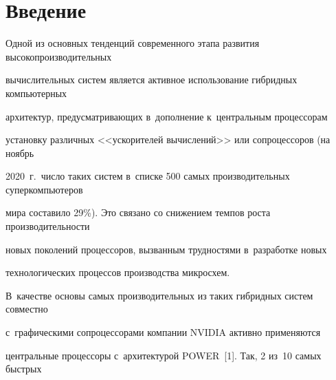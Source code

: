 














 \thispagestyle{headings}


 


 \vspace*{-20pt}





\section{Введение}





Одной из основных тенденций современного этапа развития высокопроизводительных 


вычислительных систем является активное использование гибридных компьютерных 


архитектур, предусматривающих в~дополнение к~центральным процессорам 


установку различных <<ускорителей вычислений>> или сопроцессоров (на ноябрь 


2020~г.\ число таких систем в~списке 500 самых производительных суперкомпьютеров 


мира составило 29\%). Это связано со снижением темпов рос\-та производительности 


новых поколений процессоров, вызванным трудностями в~разработке новых 


технологических процессов производства микросхем.





В~качестве основы самых производительных из таких гибридных систем совместно 


с~графическими сопроцессорами компании NVIDIA активно применяются 


центральные процессоры с~архитектурой POWER~[1]. Так, 2 из~10 самых быстрых 


